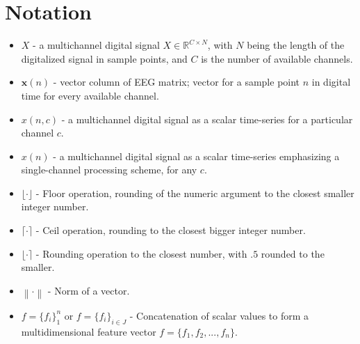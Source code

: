 \chapter*{Notation}

\begin{itemize}
\item $X$ -  a multichannel digital signal $X \in \mathbb{R}^{C \times N}$, with $N$ being the length of the digitalized signal in sample points, and $C$ is the number of available channels.  
\item $\mathbf{x}(n)$ - vector column of EEG matrix; vector for a sample point $n$ in digital time for every available channel.  
\item $x(n,c)$ - a multichannel digital signal as a scalar time-series for a particular channel $c$.  
\item $x(n)$ - a multichannel digital signal as a scalar time-series emphasizing a single-channel processing scheme, for any $c$.
\item $\lfloor \cdot \rfloor$ - Floor operation, rounding of the numeric argument to the closest smaller integer number.
\item $\lceil \cdot \rceil$ - Ceil operation, rounding to the closest bigger integer number.
\item $\lfloor \cdot \rceil$ - Rounding operation to the closest number, with $.5$ rounded to the smaller.
\item $\left\lVert \cdot \right\rVert$ - Norm of a vector.
\item $f=\{f_i\}_{1}^{n} $ or $f=\{f_i\}_{i \in J}^{} $ - Concatenation of scalar values to form a multidimensional feature vector $f=\{f_1,f_2,...,f_n\}$.
\end{itemize}


%
%
